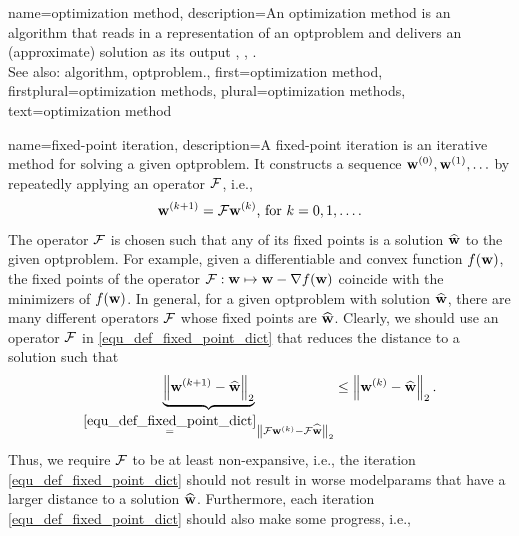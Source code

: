 {name={optimization method},
	description={An optimization method is an \gls{algorithm} that 
		reads in a representation of an \gls{optproblem} and delivers an (approximate) solution 
		as its output \cite{BoydConvexBook}, \cite{BertsekasNonLinProgr}, \cite{nesterov04}.
		 \\
		 See also: \gls{algorithm}, \gls{optproblem}.},
	first={optimization method},
	firstplural={optimization methods}, 
	plural={optimization methods}, 
	text={optimization method}
}

{name={fixed-point iteration},
	description={A fixed-point iteration is an iterative method for solving 
		a given \gls{optproblem}. It constructs a sequence ${\bf w}^{(0)}, {\bf w}^{(1)}, \ldots$ by 
		 repeatedly applying an operator $\mathcal{F}$, i.e., 
		 \begin{equation} 
		 	\label{equ_def_fixed_point_dict} 
		 	{\bf w}^{(k+1)} = \mathcal{F} {\bf w}^{(k)} \mbox{, for } k=0, 1, \ldots.
		 \end{equation} 
		 The operator $\mathcal{F}$ is chosen such that any of its fixed points is a solution 
		 $\widehat{{\bf w}}$ to the given \gls{optproblem}. For example, given a \gls{differentiable} and 
		 \gls{convex} \gls{function} $f({\bf w})$, the fixed points of the operator $\mathcal{F}: {\bf w} \mapsto {\bf w} - \nabla f({\bf w})$ 
		 coincide with the minimizers of $f({\bf w})$. In general, for a given \gls{optproblem} with solution $\widehat{{\bf w}}$, 
		 there are many different operators $\mathcal{F}$ whose fixed points are $\widehat{{\bf w}}$. 
		 Clearly, we should use an operator $\mathcal{F}$ in \eqref{equ_def_fixed_point_dict} that reduces the distance to a solution such that
		 \begin{equation} 
			\nonumber
			\underbrace{\left\Vert { {\bf w}^{(k+1)} - \widehat{\mathbf{w}}} \right\Vert_{2}}_{\stackrel{\eqref{equ_def_fixed_point_dict}}{=} \left\Vert { \mathcal{F}{\bf w}^{(k)} - \mathcal{F}\widehat{{\bf w}}} \right\Vert_{2}}  \leq 	\left\Vert { {\bf w}^{(k)} - \widehat{{\bf w}}} \right\Vert_{2}. 
		\end{equation}
		Thus, we require $\mathcal{F}$ to be at least non-expansive, i.e., the iteration \eqref{equ_def_fixed_point_dict} 
		should not result in worse \gls{modelparams} that have a larger distance to a solution $\widehat{{\bf w}}$. 
		Furthermore, each iteration \eqref{equ_def_fixed_point_dict} should also make some progress, i.e., 
}}
